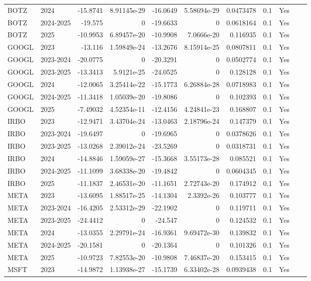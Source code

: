 \begin{longtable}{llrrrrrrrrl}
BOTZ & 2024 & -15.8741 & 8.91145e-29 & -16.0649 & 5.58694e-29 & 0.0473478 & 0.1 & Yes \\
BOTZ & 2024-2025 & -19.575 & 0 & -19.6633 & 0 & 0.0618164 & 0.1 & Yes \\
BOTZ & 2025 & -10.9953 & 6.89457e-20 & -10.9908 & 7.0666e-20 & 0.116935 & 0.1 & Yes \\
GOOGL & 2023 & -13.116 & 1.59849e-24 & -13.2676 & 8.15914e-25 & 0.0807811 & 0.1 & Yes \\
GOOGL & 2023-2024 & -20.0775 & 0 & -20.3291 & 0 & 0.0502774 & 0.1 & Yes \\
GOOGL & 2023-2025 & -13.3413 & 5.9121e-25 & -24.0525 & 0 & 0.128128 & 0.1 & Yes \\
GOOGL & 2024 & -12.0065 & 3.25414e-22 & -15.1773 & 6.26884e-28 & 0.0718983 & 0.1 & Yes \\
GOOGL & 2024-2025 & -11.3418 & 1.05039e-20 & -19.8086 & 0 & 0.102393 & 0.1 & Yes \\
GOOGL & 2025 & -7.49032 & 4.52354e-11 & -12.4156 & 4.24841e-23 & 0.168807 & 0.1 & Yes \\
IRBO & 2023 & -12.9471 & 3.43704e-24 & -13.0463 & 2.18796e-24 & 0.147379 & 0.1 & Yes \\
IRBO & 2023-2024 & -19.6497 & 0 & -19.6965 & 0 & 0.0378626 & 0.1 & Yes \\
IRBO & 2023-2025 & -13.0268 & 2.39012e-24 & -23.5269 & 0 & 0.0318731 & 0.1 & Yes \\
IRBO & 2024 & -14.8846 & 1.59059e-27 & -15.3668 & 3.55173e-28 & 0.085521 & 0.1 & Yes \\
IRBO & 2024-2025 & -11.1099 & 3.68338e-20 & -19.4842 & 0 & 0.0604345 & 0.1 & Yes \\
IRBO & 2025 & -11.1837 & 2.46531e-20 & -11.1651 & 2.72743e-20 & 0.174912 & 0.1 & Yes \\
META & 2023 & -13.6095 & 1.88517e-25 & -14.1304 & 2.3392e-26 & 0.103777 & 0.1 & Yes \\
META & 2023-2024 & -16.4205 & 2.53312e-29 & -22.1902 & 0 & 0.119711 & 0.1 & Yes \\
META & 2023-2025 & -24.4412 & 0 & -24.547 & 0 & 0.124532 & 0.1 & Yes \\
META & 2024 & -13.0355 & 2.29791e-24 & -16.9361 & 9.69472e-30 & 0.139832 & 0.1 & Yes \\
META & 2024-2025 & -20.1581 & 0 & -20.1364 & 0 & 0.101326 & 0.1 & Yes \\
META & 2025 & -10.9723 & 7.82553e-20 & -10.9808 & 7.46837e-20 & 0.153415 & 0.1 & Yes \\
MSFT & 2023 & -14.9872 & 1.13938e-27 & -15.1739 & 6.33402e-28 & 0.0939438 & 0.1 & Yes \\

\end{longtable}

